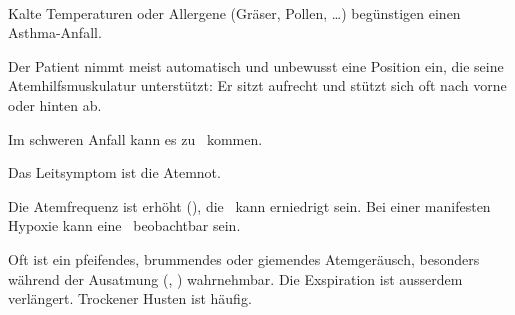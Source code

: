 



\TextSlide
{\TxABCDE}
{~
\begin{ABCDEText}
  \item[\ABCDE{1}] Kalte Temperaturen oder Allergene
  (Gräser, Pollen, \ldots) begünstigen einen Asthma-Anfall.
  \item[\ABCDE{2}] Der Patient nimmt meist automatisch und unbewusst eine
  Position ein, die seine Atemhilfsmuskulatur unterstützt: Er
  sitzt aufrecht und stützt sich oft nach vorne oder hinten
  ab.
  \item[\ABCDE{3}] Im schweren Anfall kann es zu
  {\RedFlag}\, kommen.
  \item[\ABCDE{4}] Das Leitsymptom ist die Atemnot.
  \item[\ABCDE{B}] Die Atemfrequenz ist erhöht
  (), die {\RedFlag}\,
  kann erniedrigt sein. Bei einer manifesten Hypoxie kann eine
  {\RedFlag}\, beobachtbar sein.
  
  Oft ist ein pfeifendes,
  brummendes oder giemendes Atemgeräusch, besonders während
  der Ausatmung (, ) wahrnehmbar. Die Exspiration ist ausserdem
  verlängert. Trockener Husten ist häufig.
  
  

\end{ABCDEText}}
